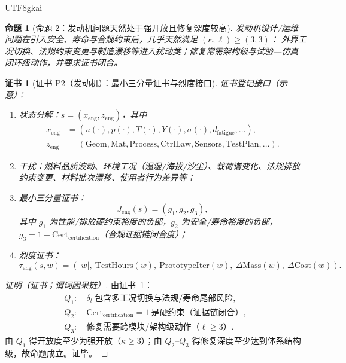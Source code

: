 \documentclass[12pt]{article}
\newtheorem{proposition}{命题}[section]
\newtheorem{Certificate}{证书}[section]
\newcommand{\Cert}{\ensuremath{\mathrm{Cert}}}
\begin{document}
\begin{CJK*}{UTF8}{gkai}
\begin{proposition}[命题 2：发动机问题天然处于强开放且修复深度较高]
\label{prop:tex25-engine}
发动机设计/运维问题在引入安全、寿命与合规约束后，几乎天然满足 $(\kappa,\ell)\ge(3,3)$：
外界工况切换、法规约束变更与制造漂移等进入扰动类；修复常需架构级与试验—仿真闭环级动作，并要求证书闭合。
\end{proposition}

\begin{Certificate}[证书 P2（发动机）：最小三分量证书与烈度接口]
\label{cert:tex25-engine}
证书登记接口（示意）：
\begin{enumerate}
  \item 状态分解：$s=(x_{\mathrm{eng}},z_{\mathrm{eng}})$，其中
  \[
    \begin{aligned}
      x_{\mathrm{eng}}
      &= (u(\cdot),p(\cdot),T(\cdot),Y(\cdot),\sigma(\cdot),d_{\mathrm{fatigue}},\dots),
      \\
      z_{\mathrm{eng}}
      &= (\mathrm{Geom},\mathrm{Mat},\mathrm{Process},\mathrm{CtrlLaw},\mathrm{Sensors},\mathrm{TestPlan},\dots).
    \end{aligned}
  \]
  \item 干扰：燃料品质波动、环境工况（温湿/海拔/沙尘）、载荷谱变化、法规排放约束变更、材料批次漂移、使用者行为差异等；
  \item 最小三分量证书：
  \[
    J_{\mathrm{eng}}(s)=(g_1,g_2,g_3),
  \]
  其中 $g_1$ 为性能/排放硬约束裕度的负部，$g_2$ 为安全/寿命裕度的负部，$g_3=1-\Cert_{\mathrm{certification}}$（合规证据链闭合度）；
  \item 烈度证书：
  \[
    \tau_{\mathrm{eng}}(s,w)=(|w|,\ \mathrm{TestHours}(w),\ \mathrm{PrototypeIter}(w),\ \Delta\mathrm{Mass}(w),\
      \Delta\mathrm{Cost}(w)).
  \]
\end{enumerate}
\end{Certificate}

\begin{proof}[证明（证书；谓词因果链）]
由证书~\ref{cert:tex25-engine}：
\[
  \begin{aligned}
    Q_1:&\ \delta_t\ \text{包含多工况切换与法规/寿命尾部风险},\\
    Q_2:&\ \Cert_{\mathrm{certification}}=1\ \text{是硬约束（证据链闭合）},\\
    Q_3:&\ \text{修复需要跨模块/架构级动作（}\ell\ge 3\text{）}.
  \end{aligned}
\]
由 $Q_1$ 得开放度至少为强开放（$\kappa\ge 3$）；由 $Q_2$--$Q_3$ 得修复深度至少达到体系结构级，故命题成立。证毕。
\end{proof}


\end{CJK*}
\end{document}
